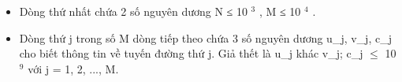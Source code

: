 \begin{itemize}
	\item     Dòng thứ nhất chứa 2 số nguyên dương N ≤ 10    $^     3    $    , M         ≤ 10     $^      4     $     .    
	\item      Dòng thứ j trong số M dòng tiếp theo chứa 3 số nguyên dương u\_j, v\_j, c\_j cho biết thông tin về tuyến đường thứ j. Giả thết là u\_j khác v\_j; c\_j  $\le$  10     $^      9     $     với j = 1, 2, ..., M.    
\end{itemize}